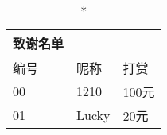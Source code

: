 \newpage
\frontmatter
\thispagestyle{empty}

~\vspace{11cm}~
\begin{longtable}{m{3cm}<{\centering}m{5cm}<{\centering}m{3cm}<{\centering}}
    \caption*{{\LARGE 致谢名单}} \\ \toprule
    编号 & 昵称  & 打赏 \\ \midrule
    00 & 1210 & 100元  \\
    01 & Lucky & 20元 \\ 
    \bottomrule
\end{longtable}
\newpage 

\frontmatter